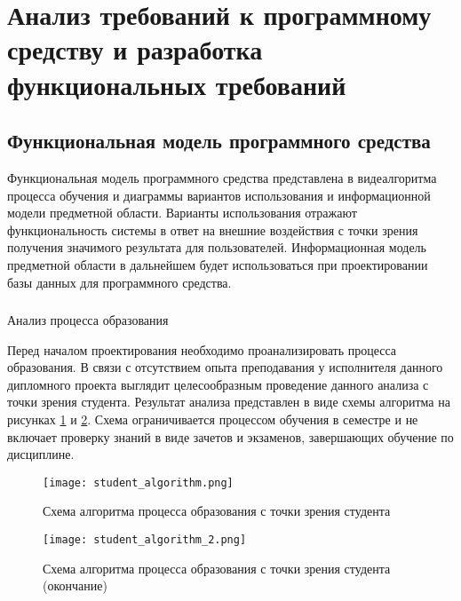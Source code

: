 \section{Анализ требований к программному средству и разработка функциональных требований}
\label{sec:domain}

\subsection{Функциональная модель программного средства}
\label{sec:domain:model}

Функциональная модель программного средства представлена в виде алгоритма процесса обучения и диаграммы вариантов использования и информационной модели предметной области. Варианты использования отражают функциональность системы в ответ на внешние воздействия с точки зрения получения значимого результата для пользователей. Информационная модель предметной области в дальнейшем будет использоваться при проектировании базы данных для программного средства.

\subsubsection{} Анализ процесса образования
\label{sec:domain:model:deeds}

Перед началом проектирования необходимо проанализировать процесса образования. В связи с отсутствием опыта преподавания у исполнителя данного дипломного проекта выглядит целесообразным проведение данного анализа с точки зрения студента. Результат анализа представлен в виде схемы алгоритма на рисунках \ref{fig:domain:model:deeds:student_algorithm} и \ref{fig:domain:model:deeds:student_algorithm_2}. Схема ограничивается процессом обучения в семестре и не включает проверку знаний в виде зачетов и экзаменов, завершающих обучение по дисциплине.

\begin{figure}
\centering
	\texttt{[image: student\_algorithm.png]}
	\caption{Схема алгоритма процесса образования с точки зрения студента}
	\label{fig:domain:model:deeds:student_algorithm}
\end{figure}

\begin{figure}
\ContinuedFloat
\centering
	\texttt{[image: student\_algorithm\_2.png]}
	\caption{Схема алгоритма процесса образования с точки зрения студента (окончание)}
	\label{fig:domain:model:deeds:student_algorithm_2}
\end{figure}

